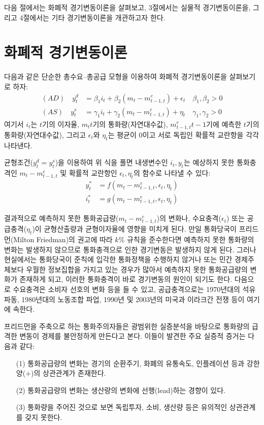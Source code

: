 다음 절에서는 화폐적 경기변동이론을 살펴보고, 3절에서는
실물적 경기변동이론을, 그리고 4절에서는 기타 경기변동이론을 개관하고자 한다.

\section{화폐적 경기변동이론}

다음과 같은 단순한 총수요--총공급 모형을 이용하여 화폐적 경기변동이론을 살펴보기로 하자:
\begin{align}
(AD) \quad y_t^d &= \beta_1 i_t + \beta_2(m_t - m_{t-1, t}^e) + \epsilon_t
\quad \beta_1, \beta_2 > 0
\\
(AS) \quad  y_t^s &= \gamma_1 i_t + \gamma_2(m_t - m_{t-1, t}^e) + \eta_t
\quad \gamma_1, \gamma_2 > 0
\end{align}
여기서 $i_t$는 $t$기의 이자율, $m_t$\은 $t$기의
통화량(자연대수값), $m_{t-1,t}^e$\은 $t-1$기에 예측한 $t$기의
통화량(자연대수값), 그리고 $\epsilon_t$와 $\eta_t$는 평균이 0이고
서로 독립인 확률적 교란항을 각각 나타낸다.

균형조건($y_t^d=y_t^s$)을 이용하여 위 식을 풀면 내생변수인 $i_t,
y_t$는 예상하지 못한 통화충격인 $m_t - m_{t-1, t}^e$ 및 확률적
교란항인 $\epsilon_t, \eta_t$의 함수로 나타낼 수 있다:
\begin{align}
y_t^* &= f(m_t - m_{t-1, t}^e, \epsilon_t, \eta_t) \\
i_t^* &= g(m_t - m_{t-1, t}^e, \epsilon_t, \eta_t)
\end{align}

결과적으로 예측하지 못한 통화공급량($m_t - m_{t-1, t}^e$)의
변화나, 수요충격($\epsilon_t$) 또는
공급충격($\eta_t$)이 균형산출량과 균형이자율에
영향을 미치게 된다. 만일 통화당국이
프리드먼(Milton Friedman)의
권고에 따라 $k$\% 규칙을 준수한다면 예측하지 못한
통화량의 변화는 발생하지 않으므로 통화충격으로 인한 경기변동은
발생하지 않게 된다. 그러나 현실에서는 통화당국이
준칙에 입각한 통화정책을 수행하지 않거나 또는 민간
경제주체보다 우월한 정보집합을 가지고 있는 경우가 많아서 예측하지
못한 통화공급량의 변화가 존재하게 되고, 이러한 통화충격이 바로
경기변동의 원인이 되기도 한다. 다음으로 수요충격은 소비자 선호의
변화 등을 들 수 있고, 공급충격으로는 1970년대의 석유파동,
1980년대의 노동조합 파업, 1990년 및 2003년의 미국과 이라크간 전쟁
등이 여기에 속한다.

 프리드먼을 주축으로 하는
 통화주의자들은 광범위한 실증분석을 바탕으로
 통화량의 급격한 변동이 경제를 불안정하게 만든다고 본다.
 이들이 발견한 주요 실증적 증거는 다음과 같다:
 \begin{enumerate}
 \item[(1)]
 통화공급량의 변화는 경기의 순환주기, 화폐의 유통속도,
 인플레이션 등과 강한 양($+$)의 상관관계가 존재한다.
 \item[(2)]
 통화공급량의 변화는 생산량의 변화에 선행(lead)하는 경향이 있다.
 \item[(3)]
 통화량을 주어진 것으로 보면 독립투자, 소비, 생산량 등은 유의적인
 상관관계를 갖지 못한다.
 \end{enumerate}

